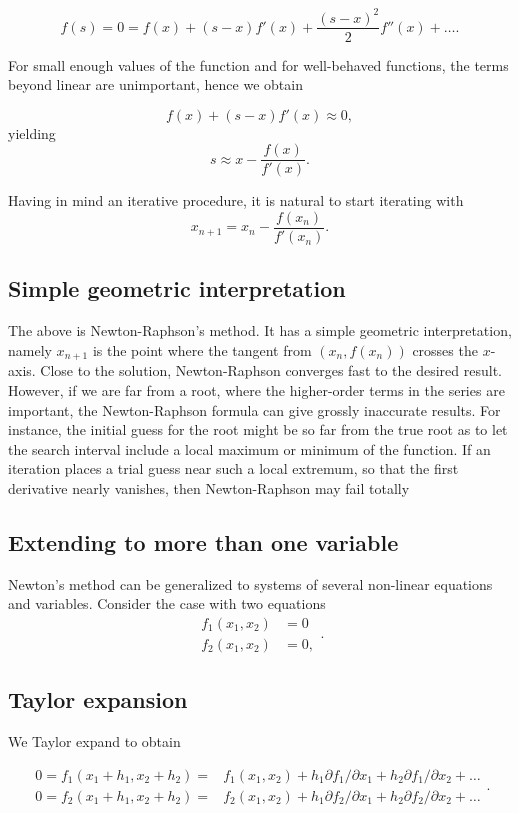 \documentclass[%
oneside,                 %
final,                   %
10pt]{article}
\begin{document}
\[
    f(s)=0=f(x)+(s-x)f'(x)+\frac{(s-x)^2}{2}f''(x) +\dots.
    \label{eq:taylornr}
\]

For small enough values of the function and for well-behaved
functions, the terms beyond linear are unimportant, hence we obtain

\[
   f(x)+(s-x)f'(x)\approx 0,
\]
yielding
\[
   s\approx x-\frac{f(x)}{f'(x)}.
\]

Having in mind an iterative procedure, it is natural to start iterating with
\[
   x_{n+1}=x_n-\frac{f(x_n)}{f'(x_n)}.
\]

\subsection{Simple geometric interpretation}

The above is Newton-Raphson's method. It has a simple geometric
interpretation, namely $x_{n+1}$ is the point where the tangent from
$(x_n,f(x_n))$ crosses the $x$-axis.  Close to the solution,
Newton-Raphson converges fast to the desired result. However, if we
are far from a root, where the higher-order terms in the series are
important, the Newton-Raphson formula can give grossly inaccurate
results. For instance, the initial guess for the root might be so far
from the true root as to let the search interval include a local
maximum or minimum of the function.  If an iteration places a trial
guess near such a local extremum, so that the first derivative nearly
vanishes, then Newton-Raphson may fail totally

\subsection{Extending to more than one variable}

Newton's method can be generalized to systems of several non-linear equations
and variables. Consider the case with two equations
\[
   \begin{array}{cc} f_1(x_1,x_2) &=0\\
                     f_2(x_1,x_2) &=0,\end{array}.
\]

\subsection{Taylor expansion}
We Taylor expand to obtain

\[
   \begin{array}{cc} 0=f_1(x_1+h_1,x_2+h_2)=&f_1(x_1,x_2)+h_1
                     \partial f_1/\partial x_1+h_2
                     \partial f_1/\partial x_2+\dots\\
                     0=f_2(x_1+h_1,x_2+h_2)=&f_2(x_1,x_2)+h_1
                     \partial f_2/\partial x_1+h_2
                     \partial f_2/\partial x_2+\dots
                       \end{array}.
\]
\end{document}
